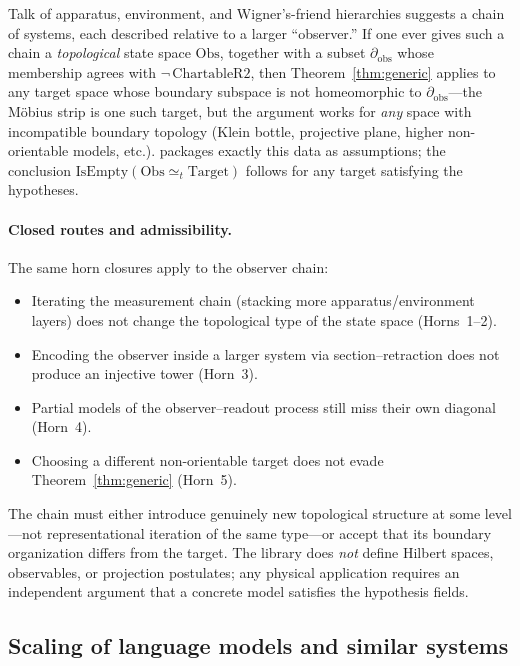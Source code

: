 \documentclass[11pt]{article}
\begin{document}
Talk of apparatus, environment, and Wigner's-friend hierarchies suggests a chain of
systems, each described relative to a larger ``observer.'' If one ever gives such
a chain a \emph{topological} state space $\mathrm{Obs}$, together with a subset
$\partial_{\mathrm{obs}}$ whose membership agrees with
$\neg\,\mathrm{ChartableR2}$, then Theorem~\ref{thm:generic} applies to any
target space whose boundary subspace is not homeomorphic to
$\partial_{\mathrm{obs}}$---the M\"obius strip is one such target, but the
argument works for \emph{any} space with incompatible boundary topology (Klein
bottle, projective plane, higher non-orientable models, etc.).
 packages exactly this data as
assumptions; the conclusion
$\mathrm{IsEmpty}(\mathrm{Obs} \simeq_t \mathrm{Target})$ follows for
any target satisfying the hypotheses.

\paragraph{Closed routes and admissibility.}
The same horn closures apply to the observer chain:
\begin{itemize}[leftmargin=1.5em,itemsep=0pt,topsep=0.3ex,parsep=0pt]
\item Iterating the measurement chain (stacking more
  apparatus/environment layers) does not change the topological type of
  the state space (Horns~1--2).
\item Encoding the observer inside a larger system via
  section--retraction does not produce an injective tower (Horn~3).
\item Partial models of the observer--readout process still miss their
  own diagonal (Horn~4).
\item Choosing a different non-orientable target does not evade
  Theorem~\ref{thm:generic} (Horn~5).
\end{itemize}
The chain must either introduce genuinely new topological structure at
some level---not representational iteration of the same type---or
accept that its boundary organization differs from the target.  The
library does \emph{not} define Hilbert spaces, observables, or
projection postulates; any physical application requires an independent
argument that a concrete model satisfies the hypothesis fields.

\subsection{Scaling of language models and similar systems}
\end{document}
